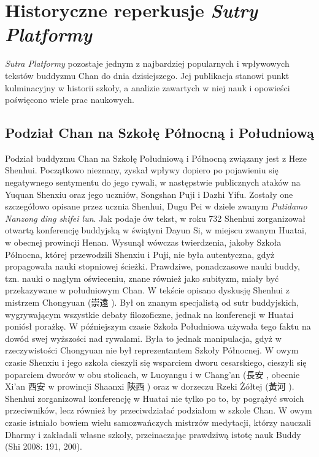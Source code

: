 \chapter{Historyczne reperkusje \textit{Sutry Platformy}}
\label{ch:chapter_four}
\textit{Sutra Platformy} pozostaje jednym z najbardziej popularnych i wpływowych tekstów buddyzmu Chan do dnia dzisiejszego. Jej publikacja stanowi punkt kulminacyjny w historii szkoły, a analizie zawartych w niej nauk i opowieści poświęcono wiele prac naukowych.

\section{Podział Chan na Szkołę Północną i Południową}
Podział buddyzmu Chan na Szkołę Południową i Północną związany jest z Heze Shenhui.
Początkowo nieznany, zyskał wpływy dopiero po pojawieniu się negatywnego sentymentu do jego rywali, w następstwie publicznych ataków na Yuquan Shenxiu oraz jego uczniów, Songshan Puji i Dazhi Yifu.
Zostały one szczegółowo opisane przez ucznia Shenhui, Dugu Pei w dziele zwanym \textit{Putidamo Nanzong ding shifei lun}. %
Jak podaje ów tekst, w roku 732 Shenhui zorganizował otwartą konferencję buddyjską w świątyni Dayun Si, w miejscu zwanym Huatai, w obecnej prowincji Henan.\label{Huatai}
Wysunął wówczas twierdzenia, jakoby Szkoła Północna, której przewodzili Shenxiu i Puji, nie była autentyczna, gdyż propagowała nauki stopniowej ścieżki.
Prawdziwe, ponadczasowe nauki buddy, tzn. nauki o nagłym oświeceniu, znane również jako subityzm, miały być przekazywane w południowym Chan.
W tekście opisano dyskusję Shenhui z mistrzem Chongyuan (崇遠 ).
Był on znanym specjalistą od sutr buddyjskich, wygrywającym wszystkie debaty filozoficzne, jednak na konferencji w Huatai poniósł porażkę.
W późniejszym czasie Szkoła Południowa używała tego faktu na dowód swej wyższości nad rywalami.
Była to jednak manipulacja, gdyż w rzeczywistości Chongyuan nie był reprezentantem Szkoły Północnej.
W owym czasie Shenxiu i jego szkoła cieszyli się wsparciem dworu cesarskiego, cieszyli się poparciem dworów w obu stolicach, w Luoyangu i w Chang'an (長安 , obecnie Xi'an 西安  w prowincji Shaanxi 陝西 ) oraz w dorzeczu Rzeki Żółtej (黃河 ).
Shenhui zorganizował konferencję w Huatai nie tylko po to, by pogrążyć swoich przeciwników, lecz również by przeciwdziałać podziałom w szkole Chan.
W owym czasie istniało bowiem wielu samozwańczych mistrzów medytacji, którzy nauczali Dharmy i zakładali własne szkoły, przeinaczając prawdziwą istotę nauk Buddy
(Shi 2008: 191, 200).

